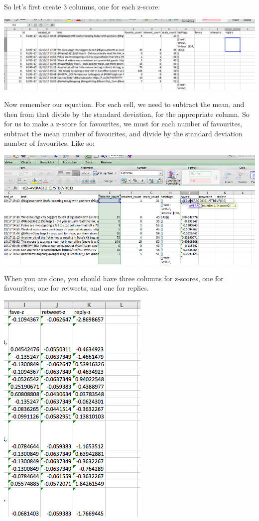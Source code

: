 \documentclass[]{book}
\theoremstyle{definition}
\theoremstyle{definition}
\theoremstyle{definition}
\theoremstyle{remark}
\begin{document}
So let's first create 3 columns, one for each z-score:

\includegraphics{imgs/z-cols_created.png}

Now remember our equation. For each cell, we need to subtract the mean,
and then from that divide by the standard deviation, for the appropriate
column. So for us to make a z-score for favourites, we must for each
number of favourites, subtract the mean number of favourites, and divide
by the standard deviation number of favourites. Like so:

\includegraphics{imgs/fave_z.png}

When you are done, you should have three columns for z-scores, one for
favourites, one for retweets, and one for replies.

\includegraphics{imgs/3_z_cols.png}
\end{document}
